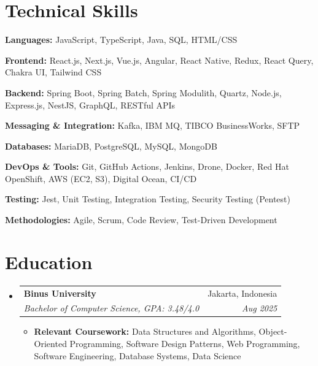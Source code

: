 \documentclass[letterpaper,11pt]{article}
\makeatletter
\newcommand{\resumeItem}[1]{
  \item\small{
    {#1 \vspace{-2pt}}
  }
}
\newcommand{\resumeEducationHeading}[4]{
  \vspace{-2pt}\item
    \begin{tabular*}{0.97\textwidth}[t]{l@{\extracolsep{\fill}}r}
      \textbf{#1} & #2 \\
      \textit{\small#3} & \textit{\small #4} \\
    \end{tabular*}\vspace{-5pt}
}
\newcommand{\resumeSubHeadingListStart}{\begin{itemize}[leftmargin=0.15in, label={}]}
\newcommand{\resumeSubHeadingListEnd}{\end{itemize}}
\newcommand{\resumeItemListStart}{\begin{itemize}}
\newcommand{\resumeItemListEnd}{\end{itemize}\vspace{-5pt}}
\makeatother
\begin{document}
\section{Technical Skills}
  \vspace{1pt}
  \resumeSubHeadingListStart
    \small{\item{
        \textbf{Languages:}{ JavaScript, TypeScript, Java, SQL, HTML/CSS} \\ \vspace{2pt}

        \textbf{Frontend:}{ React.js, Next.js, Vue.js, Angular, React Native, Redux, React Query, Chakra UI, Tailwind CSS} \\ \vspace{2pt}

        \textbf{Backend:}{ Spring Boot, Spring Batch, Spring Modulith, Quartz, Node.js, Express.js, NestJS, GraphQL, RESTful APIs} \\ \vspace{2pt}

        \textbf{Messaging \& Integration:}{ Kafka, IBM MQ, TIBCO BusinessWorks, SFTP} \\ \vspace{2pt}

        \textbf{Databases:}{ MariaDB, PostgreSQL, MySQL, MongoDB} \\ \vspace{2pt}

        \textbf{DevOps \& Tools:}{ Git, GitHub Actions, Jenkins, Drone, Docker, Red Hat OpenShift, AWS (EC2, S3), Digital Ocean, CI/CD} \\ \vspace{2pt}

        \textbf{Testing:}{ Jest, Unit Testing, Integration Testing, Security Testing (Pentest)} \\ \vspace{2pt}

        \textbf{Methodologies:}{ Agile, Scrum, Code Review, Test-Driven Development} \\ \vspace{2pt}
    }}
  \resumeSubHeadingListEnd


\section{Education}
  \vspace{2pt}
  \resumeSubHeadingListStart
    \resumeEducationHeading
      {Binus University}
      {Jakarta, Indonesia}
      {Bachelor of Computer Science, GPA: 3.48/4.0}
      {Aug 2025}
      \resumeItemListStart
        \resumeItem{\textbf{Relevant Coursework:} Data Structures and Algorithms, Object-Oriented Programming, Software Design Patterns, Web Programming, Software Engineering, Database Systems, Data Science}
      \resumeItemListEnd
  \resumeSubHeadingListEnd
\end{document}
